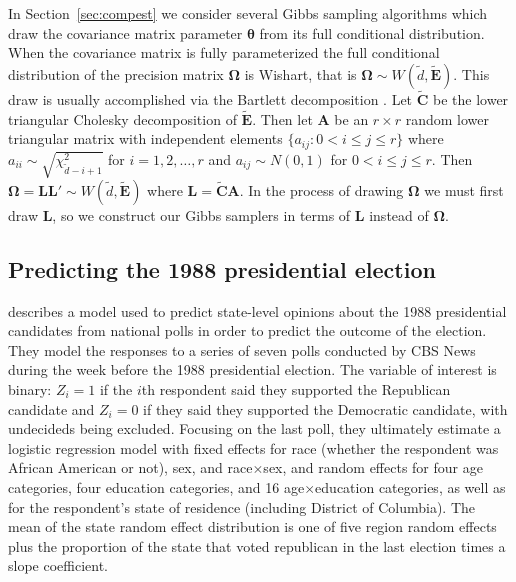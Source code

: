 \documentclass[12pt]{article}
\begin{document}
In Section~\ref{sec:compest} we consider several Gibbs sampling algorithms which draw the covariance matrix parameter $\bm{\theta}$ from its full conditional distribution. When the covariance matrix is fully parameterized the full conditional distribution of the precision matrix $\bm{\Omega}$ is Wishart, that is $\bm{\Omega} \sim W(\widetilde{d}, \widetilde{\bm{E}})$. This draw is usually accomplished via the Bartlett decomposition \citep{smith1972algorithm}. Let $\widetilde{\bm{C}}$ be the lower triangular Cholesky decomposition of $\widetilde{\bm{E}}$. Then let $\bm{A}$ be an $r\times r$ random lower triangular matrix with independent elements $\{a_{ij}:0<i\le j\le r\}$ where $a_{ii} \sim \sqrt{\chi^2_{\widetilde{d} - i + 1}}$ for $i=1,2,\dots,r$ and $a_{ij} \sim N(0,1)$ for $0<i\le j\le r$. Then $\bm{\Omega} = \bm{L}\bm{L}' \sim W(\widetilde{d}, \widetilde{\bm{E}})$ where $\bm{L} = \widetilde{\bm{C}}\bm{A}$. In the process of drawing $\bm{\Omega}$ we must first draw $\bm{L}$, so we construct our Gibbs samplers in terms of $\bm{L}$ instead of $\bm{\Omega}$.


\subsection{Predicting the 1988 presidential election}\label{sec:pres}
\citet[Chapter~14]{gelman2006data} describes a model used to predict state-level opinions about the 1988 presidential candidates from national polls in order to predict the outcome of the election. They model the responses to a series of seven polls conducted by CBS News during the week before the 1988 presidential election. The variable of interest is binary: $Z_i=1$ if the $i$th respondent said they supported the Republican candidate and $Z_i=0$ if they said they supported the Democratic candidate, with undecideds being excluded. Focusing on the last poll, they ultimately estimate a logistic regression model with fixed effects for race (whether the respondent was African American or not), sex, and race$\times$sex, and random effects for four age categories, four education categories, and 16 age$\times$education categories, as well as for the respondent's state of residence (including District of Columbia). The mean of the state random effect distribution is one of five region random effects plus the proportion of the state that voted republican in the last election times a slope coefficient. 
\end{document}
